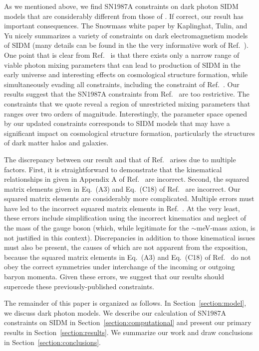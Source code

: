 \documentclass[nofootinbib,prd,superscriptaddress,twocolumn]{revtex4}
\begin{document}
As we mentioned above, we find SN1987A constraints on dark photon SIDM models that are considerably different 
from those of \cite{dent_etal12}. If correct, our result has important consequences. 
The Snowmass white paper by Kaplinghat, Tulin, and Yu \cite{kaplinghat_etal13_whitepaper} nicely 
summarizes a variety of constraints on dark electromagnetism models of SIDM (many details can be 
found in the the very informative work of Ref.~\cite{bjorken_etal09}). 
One point that is clear from Ref.~\cite{kaplinghat_etal13_whitepaper} is that there exists 
only a narrow range of viable photon mixing parameters that can lead to production of SIDM in the early universe and 
interesting effects on cosmological structure formation, while simultaneously evading all constraints, 
including the constraint of Ref.~\cite{dent_etal12}. Our results suggest that the SN1987A constraints from 
Ref.~\cite{dent_etal12} are too restrictive. The constraints that we quote reveal a region of unrestricted mixing 
parameters that ranges over two orders of magnitude. Interestingly, the parameter space opened by our updated 
constraints corresponds to SIDM models that may have a significant impact on cosmological structure formation, 
particularly the structures of dark matter halos and galaxies. 


The discrepancy between our result and that of Ref.~\cite{dent_etal12} arises due to multiple factors. First, it is straightforward to 
demonstrate that the kinematical relationships in given in Appendix A of Ref.~\cite{dent_etal12} are incorrect. Second, the 
squared matrix elements given in Eq.~(A3) and Eq.~(C18) of Ref.~\cite{dent_etal12} are incorrect. Our squared matrix elements 
are considerably more complicated. Multiple errors must have led to the incorrect squared matrix elements in 
Ref.~\cite{dent_etal12}. At the very least, these errors include simplification using the incorrect kinematics and neglect of the 
mass of the gauge boson (which, while legitimate for the $\sim$meV-mass axion, is not justified in this context). 
Discrepancies in addition to those kinematical issues must also be present, 
the causes of which are not apparent from the exposition, because the squared matrix 
elements in Eq.~(A3) and Eq.~(C18) of Ref.~\cite{dent_etal12} do not obey the 
correct symmetries under interchange of the incoming or outgoing baryon momenta. 
Given these errors, we suggest that our results should supercede these previously-published constraints.


The remainder of this paper is organized as follows. In Section~\ref{section:model}, we discuss 
dark photon models. We describe our calculation of SN1987A constraints on SIDM in 
Section~\ref{section:computational} and present our primary results in Section~\ref{section:results}. 
We summarize our work and draw conclusions in Section~\ref{section:conclusions}. 
\end{document}
